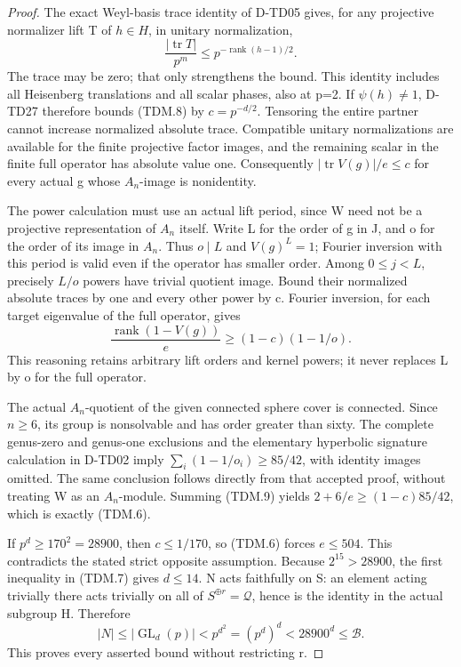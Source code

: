 \begin{proof}
The exact Weyl-basis trace identity of D-TD05 gives, for any
projective normalizer lift T of \(h\in H\), in unitary normalization,
\[
 \frac{|\operatorname{tr}T|}{p^m}
   \le p^{-\operatorname{rank}(h-1)/2}.
 \tag{TDM.8}
\]
The trace may be zero; that only strengthens the bound.  This
identity includes all Heisenberg translations and all scalar
phases, also at p=2.  If \(\psi(h)\ne1\), D-TD27 therefore
bounds (TDM.8) by \(c=p^{-d/2}\).
Tensoring the entire partner cannot increase normalized absolute
trace.  Compatible unitary normalizations are available for the
finite projective factor images, and the remaining scalar in the
finite full operator has absolute value one.  Consequently
\( |\operatorname{tr}V(g)|/e\le c\) for every actual g whose
\(A_n\)-image is nonidentity.

The power calculation must use an actual lift period, since W need
not be a projective representation of \(A_n\) itself.  Write L
for the order of g in J, and o for the order of its image in
\(A_n\).  Thus \(o\mid L\) and \(V(g)^L=1\); Fourier inversion
with this period is valid even if the operator has smaller order.
Among \(0\le j<L\), precisely \(L/o\)
powers have trivial quotient image.  Bound their normalized
absolute traces by one and every other power by c.  Fourier
inversion, for each target eigenvalue of the full operator, gives
\[
 \frac{\operatorname{rank}(1-V(g))}{e}
   \ge (1-c)(1-1/o).
 \tag{TDM.9}
\]
This reasoning retains arbitrary lift orders and kernel powers;
it never replaces L by o for the full operator.

The actual \(A_n\)-quotient of the given connected sphere cover
is connected.  Since \(n\ge6\), its group is nonsolvable and
has order greater than sixty.  The complete genus-zero and
genus-one exclusions and the elementary hyperbolic signature
calculation in D-TD02 imply
\(\sum_i(1-1/o_i)\ge85/42\), with identity images omitted.
The same conclusion follows directly from that accepted proof,
without treating W as an \(A_n\)-module.  Summing (TDM.9) yields
\(2+6/e\ge(1-c)85/42\), which is exactly (TDM.6).

If \(p^d\ge170^2=28900\), then \(c\le1/170\), so
(TDM.6) forces \(e\le504\).  This contradicts the stated
strict opposite assumption.  Because \(2^{15}>28900\), the
first inequality in (TDM.7) gives \(d\le14\).
N acts faithfully on S: an element acting trivially there acts
trivially on all of \(S^{\oplus r}=\mathcal Q\), hence is
the identity in the actual subgroup H.  Therefore
\[
 |N|\le|\operatorname{GL}_d(p)|<p^{d^2}
                =(p^d)^d<28900^d\le\mathcal B.
 \tag{TDM.10}
\]
This proves every asserted bound without restricting r.
\end{proof}

